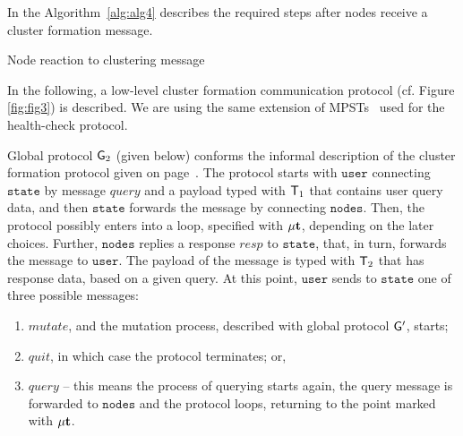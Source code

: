 In the Algorithm~\ref{alg:alg4} describes the required steps after nodes receive a cluster formation message.

\begin{algorithm}[H]
	\SetAlgoLined
	\caption{Node reaction to clustering message}
	\label{alg:alg4}
\end{algorithm}

\noindent
In the following, a low-level cluster formation communication protocol (cf. Figure \ref{fig:fig3}) is described. We are using the same extension of MPSTs~\cite{HuY17} used for the health-check protocol.

Global protocol ${\sf G}_2$ (given below) conforms the informal description of the cluster formation protocol given on page~\pageref{cluster_formation_informal_description}. 
The protocol starts with $\mathtt{user}$ connecting $\mathtt{state}$ by message $\mathit{query}$ and a payload typed with ${\mathsf T}_1$ that contains user query data, and  then $\mathtt{state}$ forwards the message by connecting $\mathtt{nodes}$. 
Then, the protocol possibly enters into a loop, specified with $\mu\textbf{t}$, depending on the later choices. 
Further, $\mathtt{nodes}$ replies a response $\mathit{resp}$ to $\mathtt{state}$, that, in turn, forwards the message to $\mathtt{user}$. The payload of the message is typed with ${\mathsf T}_2$ that has response data, based on a given query. 
At this point, $\mathtt{user}$  sends to $\mathtt{state}$ one of three possible messages:

\begin{enumerate}[start=1,label={(\bfseries \arabic*)}]
	\item $\mathit{mutate}$, and the mutation process, described with global protocol ${\sf G}'$, starts; 
	\item $\mathit{quit}$, in which case the protocol terminates; or,
	\item $\mathit{query}$ -- this means the process of querying starts again, the query message is forwarded to $\mathtt{nodes}$ and the protocol loops, returning to the point marked with $\mu\textbf{t}$.
\end{enumerate}

